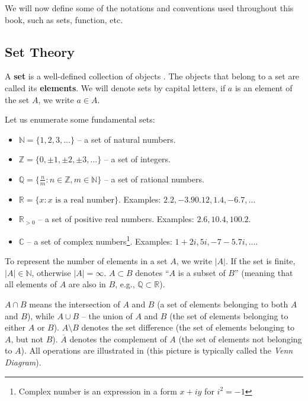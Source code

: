\documentclass[../lecture-notes-148x210.tex]{subfiles}
\begin{document}
We will now define some of the notations and conventions used throughout this book, such as sets, function, etc.

\subsection*{Set Theory}

A \textbf{set} is a well-defined collection of objects \cite[section 1]{Judson_2012}. The objects that belong to a set are called 
its \textbf{elements}. We will denote sets by capital letters, if $a$ is an element of the set $A$, 
we write $a \in A$.

Let us enumerate some fundamental sets:

\begin{itemize}
    \item $\mathbb{N} = \{1, 2, 3, \dots\}$ -- a set of natural numbers.
    \item $\mathbb{Z} = \{0, \pm 1, \pm 2, \pm 3, \dots\}$ -- a set of integers.
    \item $\mathbb{Q} = \{\frac{n}{m}: n \in \mathbb{Z}, m \in \mathbb{N}\}$ -- a set of rational numbers.
    \item $\mathbb{R} = \{x : x \text{ is a real number}\}$. Examples: $2.2, -3.9 0.12, 1.4, -6.7, \dots$
    \item $\mathbb{R}_{>0}$ -- a set of positive real numbers. Examples: $2.6, 10.4, 100.2$.
    \item $\mathbb{C}$ -- a set of complex numbers\footnote{Complex number is an expression in a form $x+iy$ for $i^2=-1$}. 
    Examples: $1+2i, 5i, -7-5.7i, \dots$.
\end{itemize}

To represent the number of elements in a set $A$, we write $|A|$. If the set is finite, $|A| \in \mathbb{N}$, 
otherwise $|A| = \infty$. $A \subset B$ denotes ``$A$ is a subset of $B$'' (meaning that all elements of $A$ 
are also in $B$, e.g., $\mathbb{Q} \subset \mathbb{R}$).

$A \cap B$ means the intersection of $A$ and $B$ (a set of elements belonging to both $A$ and $B$), while 
$A \cup B$ -- the union of $A$ and $B$ (the set of elements belonging to either $A$ or $B$). $A \setminus B$ 
denotes the set difference (the set of elements belonging to $A$, but not $B$). $\overline{A}$ denotes the 
complement of $A$ (the set of elements not belonging to $A$). All operations are illustrated in 
 (this picture is typically called the \textit{Venn Diagram}).
\end{document}
